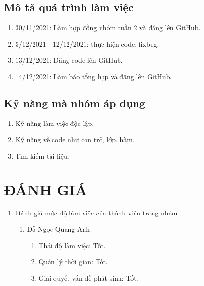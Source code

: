 \documentclass[a4paper,14pt]{extreport}
\begin{document}
\section{Mô tả quá trình làm việc}
\begin{enumerate}[-]
\item 30/11/2021: Làm hợp đồng nhóm tuần 2 và đăng lên GitHub.
\item 5/12/2021 - 12/12/2021: thực hiện code, fixbug.
\item 13/12/2021: Đăng code lên GitHub.
\item 14/12/2021: Làm báo tổng hợp và đăng lên GitHub.
\end{enumerate}
\section{Kỹ năng mà nhóm áp dụng}
\begin{enumerate}[-]
\item Kỹ năng làm việc độc lập.
\item Kỹ năng về code như con trỏ, lớp, hàm.
\item Tìm kiếm tài liệu.
\end{enumerate}

\chapter {ĐÁNH GIÁ}
\begin{enumerate}
    \item Đánh giá mức độ làm việc của thành viên trong nhóm.
    \begin{enumerate}[-]
        \item Đỗ Ngọc Quang Anh
        \begin{enumerate}[+]
            \item Thái độ làm việc: Tốt.
            \item Quản lý thời gian: Tốt.
            \item Giải quyết vấn đề phát sinh: Tốt.
        \end{enumerate}
    \end{enumerate}   
\end{enumerate}
\end{document}
